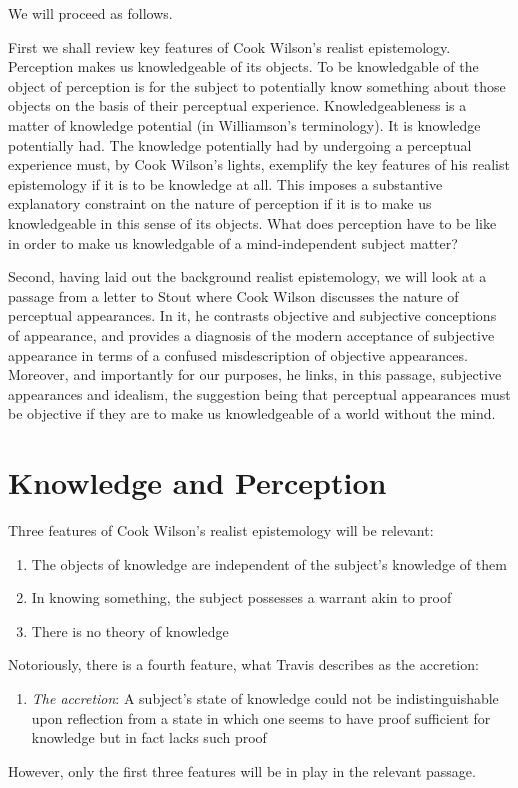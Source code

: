 \documentclass[12pt]{article}
\begin{document}
We will proceed as follows. 

First we shall review key features of Cook Wilson's realist epistemology. Perception makes us knowledgeable of its objects. To be knowledgable of the object of perception is for the subject to potentially know something about those objects on the basis of their perceptual experience. Knowledgeableness is a matter of knowledge potential (in Williamson's \citeyear{Williamson:1990uq} terminology). It is knowledge potentially had. The knowledge potentially had by undergoing a perceptual experience must, by Cook Wilson's lights, exemplify the key features of his realist epistemology if it is to be knowledge at all. This imposes a substantive explanatory constraint on the nature of perception if it is to make us knowledgeable in this sense of its objects. What does perception have to be like in order to make us knowledgable of a mind-independent subject matter? 

Second, having laid out the background realist epistemology, we will look at a passage from a letter to Stout where Cook Wilson discusses the nature of perceptual appearances. In it, he contrasts objective and subjective conceptions of appearance, and provides a diagnosis of the modern acceptance of subjective appearance in terms of a confused misdescription of objective appearances. Moreover, and importantly for our purposes, he links, in this passage, subjective appearances and idealism, the suggestion being that perceptual appearances must be objective if they are to make us knowledgeable of a world without the mind.


\section{Knowledge and Perception} %
\label{sec:knowledge_and_perception}

Three features of Cook Wilson's realist epistemology will be relevant:
\begin{enumerate}[(1)]
	\item The objects of knowledge are independent of the subject's knowledge of them
	\item In knowing something, the subject possesses a warrant akin to proof
	\item There is no theory of knowledge
\end{enumerate}
Notoriously, there is a fourth feature, what Travis describes as the accretion:
\begin{enumerate}[(4)]
	\item \emph{The accretion}: A subject's state of knowledge could not be indistinguishable upon reflection from a state in which one seems to have proof sufficient for knowledge but in fact lacks such proof
\end{enumerate}
However, only the first three features will be in play in the relevant passage.
\end{document}
